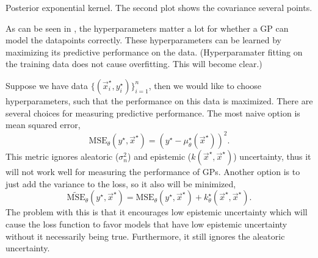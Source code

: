 \begin{marginfigure}[.5cm]
  \vfill
  \caption{Posterior exponential kernel. The second plot shows the covariance \wrt several
  points.}
  \label{fig:gp-posterior-exponential}
\end{marginfigure}

As can be seen in
,
the hyperparameters matter a lot for whether a GP can model the datapoints
correctly. These hyperparameters can be learned by maximizing its predictive
performance on the data. (Hyperparamater fitting on the training data does not
cause overfitting. This will become clear.)

Suppose we have data $\{(\vec{x}_i^\star,y_i^\star)\}_{i=1}^n$, then we would
like to choose hyperparameters, such that the performance on this data is
maximized. There are several choices for measuring predictive performance.
The most naive option is mean squared error, \[
  \text{MSE}_{\theta}(y^\star,\vec{x}^\star) = (y^\star - \mu_{\theta}^\star(\vec{x}^\star))^2
.\]
This metric ignores aleatoric ($\sigma_n^2$) and epistemic
($k(\vec{x}^\star,\vec{x}^\star)$) uncertainty, thus it will not work well for
measuring the performance of GPs. Another option is to just add the variance
to the loss, so it also will be minimized, \[
  \tilde{\text{MSE}}_{\theta}(y^\star,\vec{x}^\star) = \text{MSE}_{\theta}(y^\star,\vec{x}^\star) + k_{\theta}^\star(\vec{x}^\star,\vec{x}^\star)
.\]
The problem with this is that it encourages low epistemic uncertainty which
will cause the loss function to favor models that have low epistemic
uncertainty without it necessarily being true. Furthermore, it still ignores
the aleatoric uncertainty.

